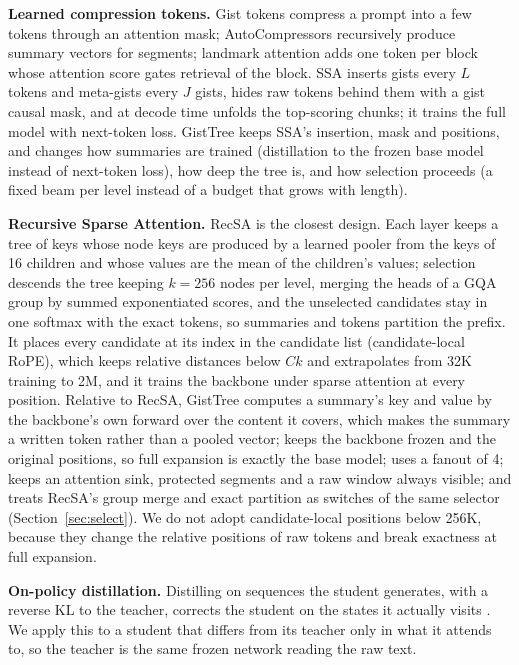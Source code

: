 \documentclass[10pt,twocolumn]{article}
\newcommand{\ours}{GistTree\xspace}
\newcommand{\para}[1]{\noindent\textbf{#1}\hspace{0.5em}}
\begin{document}
\para{Learned compression tokens.}
Gist tokens \citep{mu2023gist} compress a prompt into a few tokens through an attention mask;
AutoCompressors \citep{chevalier2023autocompressors} recursively produce summary vectors for
segments; landmark attention \citep{mohtashami2023landmark} adds one token per block whose
attention score gates retrieval of the block. SSA \citep{mao2026ssa} inserts gists every $L$
tokens and meta-gists every $J$ gists, hides raw tokens behind them with a gist causal mask,
and at decode time unfolds the top-scoring chunks; it trains the full model with next-token
loss. \ours keeps SSA's insertion, mask and positions, and changes how summaries are trained
(distillation to the frozen base model instead of next-token loss), how deep the tree is, and
how selection proceeds (a fixed beam per level instead of a budget that grows with length).

\para{Recursive Sparse Attention.}
RecSA \citep{recsa2026} is the closest design. Each layer keeps a tree of keys whose node
keys are produced by a learned pooler from the keys of 16 children and whose values are the
mean of the children's values; selection descends the tree keeping $k=256$ nodes per level,
merging the heads of a GQA group by summed exponentiated scores, and the unselected candidates
stay in one softmax with the exact tokens, so summaries and tokens partition the prefix. It
places every candidate at its index in the candidate list (candidate-local RoPE), which keeps
relative distances below $Ck$ and extrapolates from 32K training to 2M, and it trains the
backbone under sparse attention at every position. Relative to RecSA, \ours computes a
summary's key and value by the backbone's own forward over the content it covers, which
makes the summary a written token rather than a pooled vector; keeps the backbone frozen and
the original positions, so full expansion is exactly the base model; uses a fanout of 4;
keeps an attention sink, protected segments and a raw window always visible; and treats
RecSA's group merge and exact partition as switches of the same selector
(Section~\ref{sec:select}). We do not adopt candidate-local positions below 256K, because they
change the relative positions of raw tokens and break exactness at full expansion.

\para{On-policy distillation.}
Distilling on sequences the student generates, with a reverse KL to the teacher, corrects the
student on the states it actually visits \citep{agarwal2024gkd,gu2024minillm}. We apply this
to a student that differs from its teacher only in what it attends to, so the teacher is the
same frozen network reading the raw text.
\end{document}
